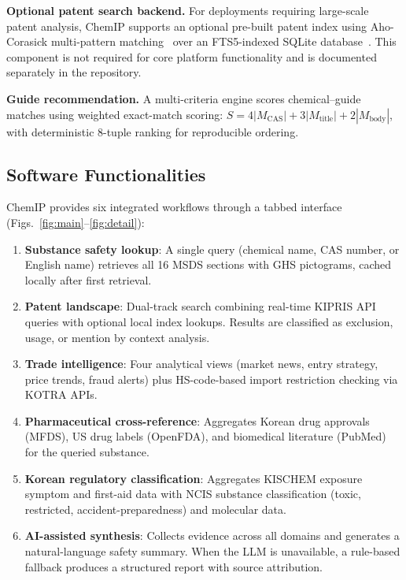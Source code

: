 \documentclass[preprint,12pt]{elsarticle}
\begin{document}
\textbf{Optional patent search backend.}
For deployments requiring large-scale patent analysis, ChemIP supports an optional pre-built patent index using Aho-Corasick multi-pattern matching~\cite{ahocorasick} over an FTS5-indexed SQLite database~\cite{sqlite_fts5}.
This component is not required for core platform functionality and is documented separately in the repository.

\textbf{Guide recommendation.}
A multi-criteria engine scores chemical--guide matches using weighted exact-match scoring: $S = 4|M_{\text{CAS}}| + 3|M_{\text{title}}| + 2|M_{\text{body}}|$, with deterministic 8-tuple ranking for reproducible ordering.

\subsection{Software Functionalities}
\label{sec:functionalities}

ChemIP provides six integrated workflows through a tabbed interface (Figs.~\ref{fig:main}--\ref{fig:detail}):

\begin{enumerate}
  \item \textbf{Substance safety lookup}: A single query (chemical name, CAS number, or English name) retrieves all 16 MSDS sections with GHS pictograms, cached locally after first retrieval.
  \item \textbf{Patent landscape}: Dual-track search combining real-time KIPRIS API queries with optional local index lookups. Results are classified as exclusion, usage, or mention by context analysis.
  \item \textbf{Trade intelligence}: Four analytical views (market news, entry strategy, price trends, fraud alerts) plus HS-code-based import restriction checking via KOTRA APIs.
  \item \textbf{Pharmaceutical cross-reference}: Aggregates Korean drug approvals (MFDS), US drug labels (OpenFDA), and biomedical literature (PubMed) for the queried substance.
  \item \textbf{Korean regulatory classification}: Aggregates KISCHEM exposure symptom and first-aid data with NCIS substance classification (toxic, restricted, accident-preparedness) and molecular data.
  \item \textbf{AI-assisted synthesis}: Collects evidence across all domains and generates a natural-language safety summary. When the LLM is unavailable, a rule-based fallback produces a structured report with source attribution.
\end{enumerate}
\end{document}

